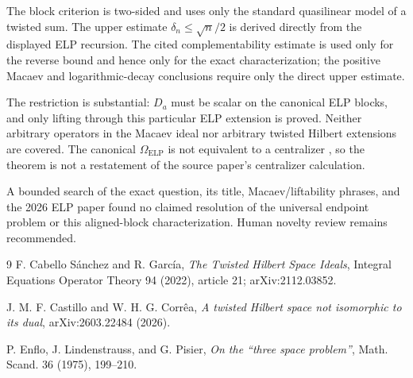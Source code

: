\documentclass[11pt]{article}
\newcommand{\ELP}{\operatorname{ELP}}
\begin{document}
The block criterion is two-sided and uses only the standard quasilinear model
of a twisted sum.  The upper estimate $\delta_n\le\sqrt n/2$ is derived directly
from the displayed ELP recursion.  The cited complementability estimate is
used only for the reverse bound and hence only for the exact characterization;
the positive Macaev and logarithmic-decay conclusions require only the direct
upper estimate.

The restriction is substantial: $D_a$ must be scalar on the canonical ELP
blocks, and only lifting through this particular ELP extension is proved.
Neither arbitrary operators in the Macaev ideal nor arbitrary twisted Hilbert
extensions are covered.  The canonical $\Omega_{\ELP}$ is not equivalent to a
centralizer \cite[Proposition 3.1]{CastilloCorrea2026}, so the theorem is not a
restatement of the source paper's centralizer calculation.

A bounded search of the exact question, its title, Macaev/liftability phrases,
and the 2026 ELP paper found no claimed resolution of the universal endpoint
problem or this aligned-block characterization.  Human novelty review remains
recommended.

\begin{thebibliography}{9}
F. Cabello S\'anchez and R. Garc\'ia,
\emph{The Twisted Hilbert Space Ideals},
Integral Equations Operator Theory 94 (2022), article 21;
arXiv:2112.03852.

J. M. F. Castillo and W. H. G. Corr\^ea,
\emph{A twisted Hilbert space not isomorphic to its dual},
arXiv:2603.22484 (2026).

P. Enflo, J. Lindenstrauss, and G. Pisier,
\emph{On the ``three space problem''},
Math. Scand. 36 (1975), 199--210.
\end{thebibliography}
\end{document}
